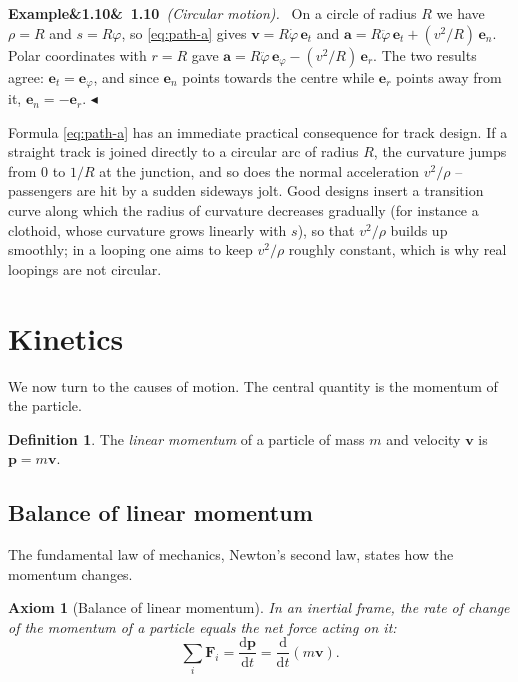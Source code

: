 \documentclass[11pt,a4paper,oneside]{report}
\numberwithin{equation}{chapter}
\newcommand{\vect}[1]{\bm{#1}}
\newcommand{\e}[1]{\vect{e}_{#1}}
\newcommand{\dv}[2]{\frac{\mathrm{d}#1}{\mathrm{d}#2}}
\theoremstyle{plain}
\newtheorem{axiom}[theorem]{Axiom}
\theoremstyle{definition}
\newtheorem{definition}[theorem]{Definition}
\theoremstyle{remark}
\newenvironment{example}[2]{%
  \par\addvspace{\bigskipamount}\noindent
  \textbf{Example\ifx&#1&\else~#1\fi}\ \textit{(#2).}\ \ignorespaces}%
  {\hfill$\blacktriangleleft$\par\addvspace{\bigskipamount}}
\newcommand{\lecture}[2]{\marginpar{\raggedright\footnotesize\textsc{Lecture #1}\\\textit{#2}}}
\begin{document}
\begin{example}{1.10}{Circular motion}
On a circle of radius $R$ we have $\rho=R$ and $s=R\varphi$, so \eqref{eq:path-a} gives
$\vect v=R\dot\varphi\,\e t$ and $\vect a=R\ddot\varphi\,\e t+(v^2/R)\,\e n$. Polar coordinates with $r=R$ gave
$\vect a=R\ddot\varphi\,\e\varphi-(v^2/R)\,\e r$. The two results agree: $\e t=\e\varphi$, and since $\e n$ points
towards the centre while $\e r$ points away from it, $\e n=-\e r$.
\end{example}

Formula \eqref{eq:path-a} has an immediate practical consequence for track design. If a straight track is joined
directly to a circular arc of radius $R$, the curvature jumps from $0$ to $1/R$ at the junction, and so does the
normal acceleration $v^2/\rho$ -- passengers are hit by a sudden sideways jolt. Good designs insert a transition
curve along which the radius of curvature decreases gradually (for instance a clothoid, whose curvature grows
linearly with $s$), so that $v^2/\rho$ builds up smoothly; in a looping one aims to keep $v^2/\rho$ roughly
constant, which is why real loopings are not circular.

\section{Kinetics}\label{sec:kinetics}
\lecture{3}{23.09.2026}
We now turn to the causes of motion. The central quantity is the momentum of the particle.

\begin{definition}
The \emph{linear momentum} of a particle of mass $m$ and velocity $\vect v$ is $\vect p=m\vect v$.
\end{definition}

\subsection{Balance of linear momentum}
The fundamental law of mechanics, Newton's second law, states how the momentum changes.

\begin{axiom}[Balance of linear momentum]
In an inertial frame, the rate of change of the momentum of a particle equals the net force acting on it:
\begin{equation}\label{eq:lmb}
  \sum_i\vect F_i=\dv{\vect p}{t}=\dv{}{t}(m\vect v).
\end{equation}
\end{axiom}
\end{document}
